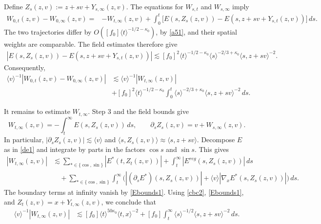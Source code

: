 \documentclass[reqno,11pt]{amsart}
\numberwithin{equation}{section}
\begin{document}
Define $Z_s(z,v):=z+sv+Y_{s,\infty}(z,v)$.  The equations for $W_{s,t}$ and $W_{s,\infty}$ imply
\[
\begin{split}
W_{0,t}(z,v)-W_{0,\infty}(z,v)
={}&-W_{t,\infty}(z,v)+\int_0^t\big[
E(s,Z_s(z,v))
-E(s,z+sv+Y_{s,t}(z,v))\big]\,ds.
\end{split}
\]
The two trajectories differ by
$O([f_0]\langle t\rangle^{-1/2-\kappa_0})$,
by \eqref{a51}, and their spatial weights are comparable.
The field estimates therefore give
\[
\begin{split}
|E(s,Z_s(z,v))
-E(s,z+sv+Y_{s,t}(z,v))|\lesssim[f_0]^2
\langle t\rangle^{-1/2-\kappa_0}
\langle s\rangle^{-2/3+\kappa_0}
\langle s,z+sv\rangle^{-2}.
\end{split}
\]
Consequently,
\begin{equation}\label{sec8-velocity-comparison}
\begin{split}
\langle v\rangle^{-1}
|W_{0,t}(z,v)-W_{0,\infty}(z,v)|&\lesssim
\langle v\rangle^{-1}|W_{t,\infty}(z,v)|\\
&+[f_0]^2\langle t\rangle^{-1/2-\kappa_0}
\int_0^t\langle s\rangle^{-2/3+\kappa_0}
\langle s,z+sv\rangle^{-2}\,ds.
\end{split}
\end{equation}

It remains to estimate $W_{t,\infty}$.
Step 3 and the field bounds give
\[
W_{t,\infty}(z,v)
=-\int_t^\infty E(s,Z_s(z,v))\,ds,
\qquad
\partial_sZ_s(z,v)=v+W_{s,\infty}(z,v).
\]
In particular,
$|\partial_sZ_s(z,v)|\lesssim\langle v\rangle$ and
$\langle s,Z_s(z,v)\rangle\approx\langle s,z+sv\rangle$.
Decompose $E$ as in \eqref{de1} and integrate by parts
in the factors $\cos s$ and $\sin s$. This gives
\[
\begin{split}
|W_{t,\infty}(z,v)|
&\lesssim
\sum_{\ast\in\{\cos,\sin\}}
|E^\ast(t,Z_t(z,v))|
+\int_t^\infty|E^{reg}(s,Z_s(z,v))|\,ds\\
&\quad+
\sum_{\ast\in\{\cos,\sin\}}\int_t^\infty
\big(
|(\partial_sE^\ast)(s,Z_s(z,v))|
+\langle v\rangle|\nabla_xE^\ast(s,Z_s(z,v))|
\big)\,ds.
\end{split}
\]
The boundary terms at infinity vanish by \eqref{Ebounds1}.
Using \eqref{cbc2}, \eqref{Ebounds1}, and
$Z_t(z,v)=x+Y_{t,\infty}(z,v)$, we conclude that
\begin{equation}\label{sec8-velocity-tail}
\begin{split}
\langle v\rangle^{-1}|W_{t,\infty}(z,v)|
&\lesssim[f_0]\langle t\rangle^{50\kappa_0}
\langle t,x\rangle^{-2}+[f_0]\int_t^\infty
\langle s\rangle^{-1/2}
\langle s,z+sv\rangle^{-2}\,ds.
\end{split}
\end{equation}
\end{document}
